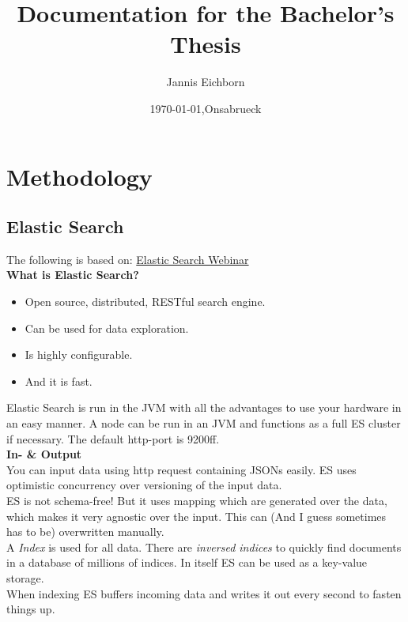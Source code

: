 \documentclass[12pt]{scrartcl}
\title{Documentation for the Bachelor's Thesis}
\subtitle{}
\author{Jannis Eichborn}
\date{\today{},Onsabrueck}
\begin{document}
\begin{titlepage}
\maketitle
\tableofcontents
\end{titlepage}


\section{Methodology}
\subsection{Elastic Search}
The following is based on:
\href{http://www.elasticsearch.org/webinars/getting-started-with-elasticsearch/?watch=1}{Elastic Search Webinar}\\

\textbf{What is Elastic Search?}
\begin{itemize}
	\item Open source, distributed, RESTful search engine.
	\item Can be used for data exploration.
	\item Is highly configurable.
	\item And it is fast. 
\end{itemize}

Elastic Search is run in the JVM with all the advantages to use your hardware in an easy manner. A node can be run in an JVM and functions as a full ES cluster if necessary. The default http-port is 9200ff.\\

\textbf{In- \& Output}\\
You can input data using http request containing JSONs easily. ES uses optimistic concurrency over versioning of the input data.\\
ES is not schema-free! But it uses mapping which are generated over the data, which makes it very agnostic over the input. This can (And I guess sometimes has to be) overwritten manually.\\
A \emph{Index} is used for all data. There are \emph{inversed indices} to quickly find documents in a database of millions of indices. In itself ES can be used as a key-value storage.\\
When indexing ES buffers incoming data and writes it out every second to fasten things up.\\
\end{document}
